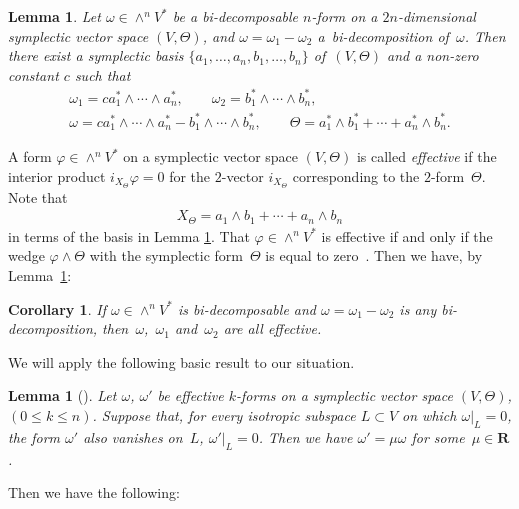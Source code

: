 \documentclass[pdftex]{sigma}
\newtheorem{Cor}[Th]{Corollary}
\newtheorem{Lem}[Th]{Lemma}
{ \theoremstyle{definition}
\newtheorem{Def}[Th]{Definition}
\newtheorem{Rem}[Th]{Remark}
\newtheorem{Ex}[Th]{Example}}
\begin{document}
\begin{Lem}
\label{symplectic basis}
Let $\omega \in \wedge^n V^*$ be a bi-decomposable $n$-form on
a $2n$-dimensional symplectic vector space $(V, \Theta)$, and
$\omega = \omega_1 - \omega_2$ a~bi-decomposition of~$\omega$.
Then there exist a symplectic basis
$\{ a_1,\dots, a_n, b_1,\dots, b_n\}$ of~$(V, \Theta)$
and a non-zero constant $c$ such that
\begin{gather*}
\omega_1  =
c  a_1^*\wedge \cdots \wedge a_n^*, \qquad
\omega_2  =   b_1^*\wedge \cdots \wedge b_n^*,
\\
\omega  =  c  a_1^*\wedge \cdots \wedge a_n^* -
b_1^*\wedge \cdots \wedge b_n^*,
\qquad
\Theta  =  a_1^* \wedge b_1^* + \cdots + a_n^* \wedge b_n^*.
\end{gather*}
\end{Lem}

A form $\varphi \in \wedge^n V^*$ on
a symplectic vector space $(V,\Theta)$
is called {\it effective} if
the interior product $i_{X_{\Theta}}\varphi = 0$ for
the $2$-vector $i_{X_{\Theta}}$ corresponding to the
$2$-form~$\Theta$.
Note that
\begin{gather*}
X_{\Theta} = a_1 \wedge b_1 + \cdots + a_n \wedge b_n
\end{gather*}
in terms of the basis in Lemma \ref{symplectic basis}.
That $\varphi \in \wedge^n V^*$ is ef\/fective if and only if
the wedge $\varphi\wedge\Theta$ with the symplectic form~$\Theta$ is equal to zero~\cite{B2, L}.
Then we have, by Lemma~\ref{symplectic basis}:

\begin{Cor}
\label{effective}
If $\omega \in \wedge^n V^*$ is bi-decomposable and
$\omega = \omega_1 - \omega_2$ is any bi-decomposition, then~$\omega$,~$\omega_1$ and~$\omega_2$ are all effective.
\end{Cor}

We will apply the following basic result to our situation.

\begin{Lem}[]\label{Lych}
Let $\omega$, $\omega'$ be effective $k$-forms on a symplectic vector space
$(V, \Theta)$, $(0\leq k\leq n)$.
Suppose that, for every isotropic subspace $L\subset V$ on which
$\omega\vert_L = 0$, the form $\omega'$ also vanishes on~$L$,
$\omega'\vert_L = 0$.
Then we have $\omega' =\mu{\omega}$ for some~$\mu \in {\mathbf{R}}$.
\end{Lem}

Then we have the following:
\end{document}
